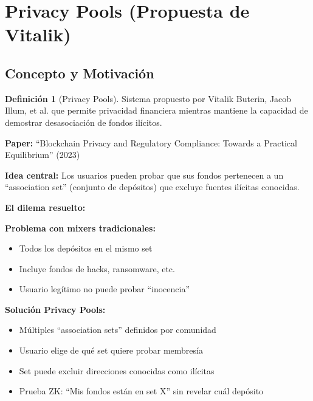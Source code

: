 \documentclass[11pt,a4paper,twoside]{book}
\theoremstyle{definition}
\newtheorem{definition}{Definición}[chapter]
\theoremstyle{remark}
\begin{document}
\section{Privacy Pools (Propuesta de Vitalik)}
\label{sec:privacy-pools}

\subsection{Concepto y Motivación}

\begin{definition}[Privacy Pools]
Sistema propuesto por Vitalik Buterin, Jacob Illum, et al. que permite privacidad financiera mientras mantiene la capacidad de demostrar desasociación de fondos ilícitos.

\textbf{Paper:} ``Blockchain Privacy and Regulatory Compliance: Towards a Practical Equilibrium'' (2023)

\textbf{Idea central:} Los usuarios pueden probar que sus fondos pertenecen a un ``association set'' (conjunto de depósitos) que excluye fuentes ilícitas conocidas.
\end{definition}

\begin{keyidea}
\textbf{El dilema resuelto:}

\textbf{Problema con mixers tradicionales:}
\begin{itemize}
    \item Todos los depósitos en el mismo set
    \item Incluye fondos de hacks, ransomware, etc.
    \item Usuario legítimo no puede probar ``inocencia''
\end{itemize}

\textbf{Solución Privacy Pools:}
\begin{itemize}
    \item Múltiples ``association sets'' definidos por comunidad
    \item Usuario elige de qué set quiere probar membresía
    \item Set puede excluir direcciones conocidas como ilícitas
    \item Prueba ZK: ``Mis fondos están en set X'' sin revelar cuál depósito
\end{itemize}
\end{keyidea}
\end{document}
